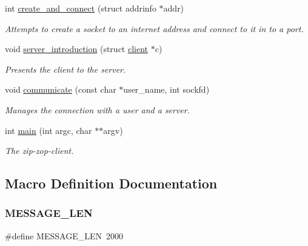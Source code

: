 \begin{DoxyCompactItemize}
int \hyperlink{zip-zop-client_8c_aff1f8c91603968e32da45fc6ef4bad4d}{create\+\_\+and\+\_\+connect} (struct addrinfo $\ast$addr)
\begin{DoxyCompactList}\small\item\em Attempts to create a socket to an internet address and connect to it in to a port. \end{DoxyCompactList}\item 
void \hyperlink{zip-zop-client_8c_acb0e43d47379736b891394dd383064be}{server\+\_\+introduction} (struct \hyperlink{structclient}{client} $\ast$c)
\begin{DoxyCompactList}\small\item\em Presents the client to the server. \end{DoxyCompactList}\item 
void \hyperlink{zip-zop-client_8c_a1c3a34b362da4351d526c8af94b228c6}{communicate} (const char $\ast$user\+\_\+name, int sockfd)
\begin{DoxyCompactList}\small\item\em Manages the connection with a user and a server. \end{DoxyCompactList}\item 
int \hyperlink{zip-zop-client_8c_a3c04138a5bfe5d72780bb7e82a18e627}{main} (int argc, char $\ast$$\ast$argv)
\begin{DoxyCompactList}\small\item\em The zip-\/zop-\/client. \end{DoxyCompactList}\end{DoxyCompactItemize}


\subsection{Macro Definition Documentation}
\mbox{\label{zip-zop-client_8c_aa2dfc63100e2bed7efb1b0cd09dea107}} 
\subsubsection{\texorpdfstring{M\+E\+S\+S\+A\+G\+E\+\_\+\+L\+EN}{MESSAGE\_LEN}}
{\footnotesize\ttfamily \#define M\+E\+S\+S\+A\+G\+E\+\_\+\+L\+EN~2000}



